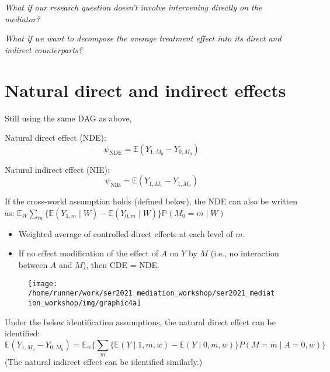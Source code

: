 \documentclass[
  12pt,
]{book}
\providecommand{\tightlist}{%
  \setlength{\itemsep}{0pt}\setlength{\parskip}{0pt}}
\theoremstyle{definition}
\theoremstyle{definition}
\theoremstyle{definition}
\renewcommand{\P}{\mathbb{P}}
\newcommand{\E}{\mathbb{E}}
\newcommand{\1}{\mathbbm{1}}
\begin{document}
\emph{What if our research question doesn't involve intervening directly on the
mediator?}

\emph{What if we want to decompose the average treatment effect into its direct and
indirect counterparts?}

\hypertarget{natural-direct-and-indirect-effects}{%
\section{Natural direct and indirect effects}\label{natural-direct-and-indirect-effects}}

Still using the same DAG as above,

Natural direct effect (NDE):
\begin{equation*}
  \psi_{\text{NDE}} = \E(Y_{1,M_0} - Y_{0,M_0})
\end{equation*}

Natural indirect effect (NIE):
\begin{equation*}
  \psi_{\text{NIE}} = \E(Y_{1,M_1} - Y_{1,M_0})
\end{equation*}

If the cross-world assumption holds (defined below), the NDE can also be written
as: \(\E_W \sum_m \{\E(Y_{1,m} \mid W) - \E(Y_{0,m} \mid W)\} \P(M_{0}=m \mid W)\)

\begin{itemize}
\tightlist
\item
  Weighted average of controlled direct effects at each level of \(m\).
\item
  If no effect modification of the effect of \(A\) on \(Y\) by \(M\) (i.e., no interaction between \(A\) and \(M\)), then CDE = NDE.
\end{itemize}

\begin{figure}

{\centering \texttt{[image: /home/runner/work/ser2021\_mediation\_workshop/ser2021\_mediation\_workshop/img/graphic4a]} 

}

\end{figure}

Under the below identification assumptions, the natural direct effect can be identified:
\begin{equation*}
\E(Y_{1,M_0} - Y_{0,M_0}) =
  \E_w\{\sum_m \{\E(Y \mid 1, m, w) - \E(Y \mid 0, m, w)\} P(M=m \mid A=0,w)\}
\end{equation*}
(The natural indirect effect can be identified similarly.)
\end{document}
